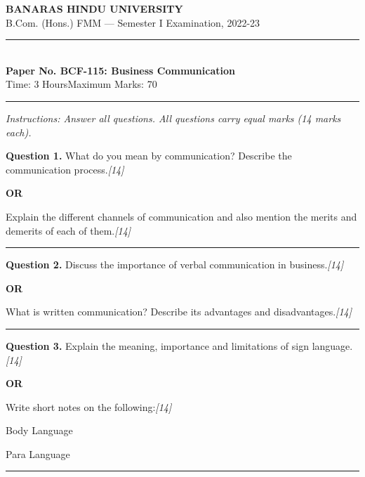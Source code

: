 \documentclass[11pt,a4paper]{article}
\newcommand{\pts}[1]{\hfill   \textit{[#1]}}
\begin{document}
\begin{center}
  {\large\bfseries BANARAS HINDU UNIVERSITY}\\[2pt]
  {\normalsize B.Com. (Hons.) FMM --- Semester I Examination, 2022-23}\\[6pt]
  \rule{0.8\linewidth}{0.5pt}\\[6pt]
  {\large\bfseries Paper No. BCF-115: Business Communication}\\[4pt]
  {\normalsize Time: 3 Hours\hfill Maximum Marks: 70}
\end{center}

\rule{\linewidth}{0.4pt}

\smallskip



\noindent   \textit{Instructions: Answer all questions. All questions carry equal marks (14 marks each).}

\bigskip




\noindent   \textbf{Question 1.}
What do you mean by communication? Describe the communication process.\pts{14}

\centerline{   \textbf{OR}}

Explain the different channels of communication and also mention the merits and demerits of each of them.\pts{14}

\medskip\rule{\linewidth}{0.2pt}




\noindent   \textbf{Question 2.}
Discuss the importance of verbal communication in business.\pts{14}

\centerline{   \textbf{OR}}

What is written communication? Describe its advantages and disadvantages.\pts{14}

\medskip\rule{\linewidth}{0.2pt}




\noindent   \textbf{Question 3.}
Explain the meaning, importance and limitations of sign language.\pts{14}

\centerline{   \textbf{OR}}

Write short notes on the following:\pts{14}

\begin{parts}
  \item Body Language
  \item Para Language
\end{parts}

\medskip\rule{\linewidth}{0.2pt}
\end{document}
